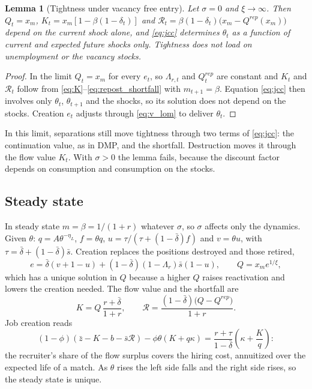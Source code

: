 \documentclass[authoryear, review, 12pt]{elsarticle}
\newtheorem{lemma}{Lemma}
\begin{document}
\begin{lemma}[Tightness under vacancy free entry]\label{lem:theta}
Let $\sigma=0$ and $\xi\to\infty$. Then $Q_t=x_m$, $K_t=x_m[1-\beta(1-\delta_t)]$ and $\mathcal{R}_t=\beta(1-\delta_t)\big(x_m-Q^{rep}(x_m)\big)$ depend on the current shock alone, and \eqref{eq:jcc} determines $\theta_t$ as a function of current and expected future shocks only. Tightness does not load on unemployment or the vacancy stocks.
\end{lemma}
\begin{proof}
In the limit $Q_t=x_m$ for every $e_t$, so $\Lambda_{r,t}$ and $Q_t^{rep}$ are constant and $K_t$ and $\mathcal{R}_t$ follow from \eqref{eq:K}--\eqref{eq:repost_shortfall} with $m_{t+1}=\beta$. Equation \eqref{eq:jcc} then involves only $\theta_t$, $\theta_{t+1}$ and the shocks, so its solution does not depend on the stocks. Creation $e_t$ adjusts through \eqref{eq:v_lom} to deliver $\theta_t$.
\end{proof}
In this limit, separations still move tightness through two terms of \eqref{eq:jcc}: the continuation value, as in DMP, and the shortfall. Destruction moves it through the flow value $K_t$. With $\sigma>0$ the lemma fails, because the discount factor depends on consumption and consumption on the stocks.

\subsection{Steady state}

In steady state $m=\beta=1/(1+r)$ whatever $\sigma$, so $\sigma$ affects only the dynamics. Given $\theta$: $q=A\theta^{-\eta_L}$, $f=\theta q$, $u=\tau/(\tau+(1-\bar\delta)f)$ and $v=\theta u$, with $\tau=\bar\delta+(1-\bar\delta)\bar s$. Creation replaces the positions destroyed and those retired,
\begin{equation}
e = \bar\delta(v+1-u) + (1-\bar\delta)(1-\Lambda_r)\bar s(1-u),\qquad Q = x_me^{1/\xi},
\end{equation}
which has a unique solution in $Q$ because a higher $Q$ raises reactivation and lowers the creation needed. The flow value and the shortfall are
\begin{equation}
K = Q\,\frac{r+\bar\delta}{1+r},\qquad \mathcal{R} = \frac{(1-\bar\delta)\big(Q-Q^{rep}\big)}{1+r}.
\end{equation}
Job creation reads
\begin{equation}\label{eq:jc_ss}
(1-\phi)(\bar z - K - b - \bar s\mathcal{R}) - \phi\theta(K+q\kappa) = \frac{r+\tau}{1-\bar\delta}\left(\kappa+\frac{K}{q}\right):
\end{equation}
the recruiter's share of the flow surplus covers the hiring cost, annuitized over the expected life of a match. As $\theta$ rises the left side falls and the right side rises, so the steady state is unique.
\end{document}
